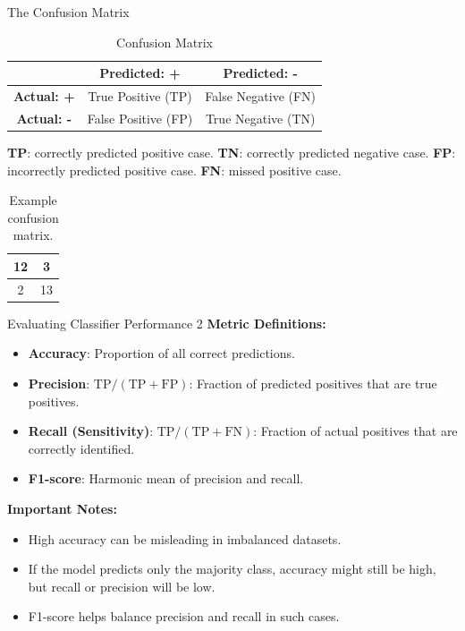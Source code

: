\documentclass{beamer}
\begin{document}
\begin{frame}{The Confusion Matrix}
  \begin{table}[h]
    \centering
    \begin{tabular}{|c|c|c|}
      \hline
      & \textbf{Predicted: +} & \textbf{Predicted: -} \\
      \hline
      \textbf{Actual: +} & True Positive (TP) & False Negative (FN) \\
      \hline
      \textbf{Actual: -} & False Positive (FP) & True Negative (TN) \\
      \hline
    \end{tabular}
    \caption{Confusion Matrix}
  \end{table}
  \vspace{0.5em}
  \textbf{TP}: correctly predicted positive case.
  \textbf{TN}: correctly predicted negative case.
  \textbf{FP}: incorrectly predicted positive case.
  \textbf{FN}: missed positive case.
  \begin{table}[|c|c|]
      \centering
      \begin{tabular}{|c|c|}
        \hline
          12 & 3 \\ \hline
          2 &  13 \\ \hline
      \end{tabular}
      \caption{Example confusion matrix.}
      \label{tab:ex-conf-mat}
  \end{table}
\end{frame}

\begin{frame}{Evaluating Classifier Performance 2}
  \textbf{Metric Definitions:}
  \begin{itemize}
    \item \textbf{Accuracy}: Proportion of all correct predictions.
    \item \textbf{Precision}: \( \text{TP} / (\text{TP} + \text{FP}) \): Fraction of predicted positives that are true positives.
    \item \textbf{Recall (Sensitivity)}: \( \text{TP} / (\text{TP} + \text{FN}) \): Fraction of actual positives that are correctly identified.
    \item \textbf{F1-score}: Harmonic mean of precision and recall.
  \end{itemize}
  \vspace{1em}
  \textbf{Important Notes:}
  \begin{itemize}
    \item High accuracy can be misleading in imbalanced datasets.
    \item If the model predicts only the majority class, accuracy might still be high, but recall or precision will be low.
    \item F1-score helps balance precision and recall in such cases.
  \end{itemize}
\end{frame}
\end{document}
